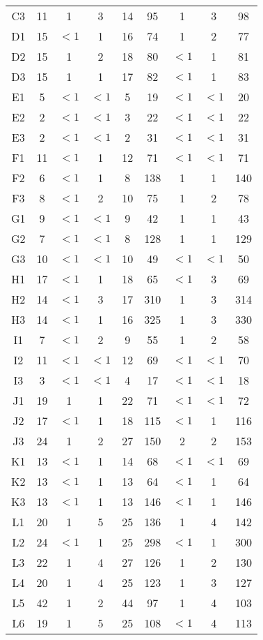 \begin{center}
\begin{longtable}{ccccc|cccc}
C3&11&1&3&14&95&1&3&98\\
D1&15&$<1$&1&16&74&1&2&77\\
D2&15&1&2&18&80&$<1$&1&81\\
D3&15&1&1&17&82&$<1$&1&83\\
E1&5&$<1$&$<1$&5&19&$<1$&$<1$&20\\
E2&2&$<1$&$<1$&3&22&$<1$&$<1$&22\\
E3&2&$<1$&$<1$&2&31&$<1$&$<1$&31\\
F1&11&$<1$&1&12&71&$<1$&$<1$&71\\
F2&6&$<1$&1&8&138&1&1&140\\
F3&8&$<1$&2&10&75&1&2&78\\
G1&9&$<1$&$<1$&9&42&1&1&43\\
G2&7&$<1$&$<1$&8&128&1&1&129\\
G3&10&$<1$&$<1$&10&49&$<1$&$<1$&50\\
H1&17&$<1$&1&18&65&$<1$&3&69\\
H2&14&$<1$&3&17&310&1&3&314\\
H3&14&$<1$&1&16&325&1&3&330\\
I1&7&$<1$&2&9&55&1&2&58\\
I2&11&$<1$&$<1$&12&69&$<1$&$<1$&70\\
I3&3&$<1$&$<1$&4&17&$<1$&$<1$&18\\
J1&19&1&1&22&71&$<1$&$<1$&72\\
J2&17&$<1$&1&18&115&$<1$&1&116\\
J3&24&1&2&27&150&2&2&153\\
K1&13&$<1$&1&14&68&$<1$&$<1$&69\\
K2&13&$<1$&1&13&64&$<1$&1&64\\
K3&13&$<1$&1&13&146&$<1$&1&146\\
L1&20&1&5&25&136&1&4&142\\
L2&24&$<1$&1&25&298&$<1$&1&300\\
L3&22&1&4&27&126&1&2&130\\
L4&20&1&4&25&123&1&3&127\\
L5&42&1&2&44&97&1&4&103\\
L6&19&1&5&25&108&$<1$&4&113\\
\end{longtable}
\end{center}

